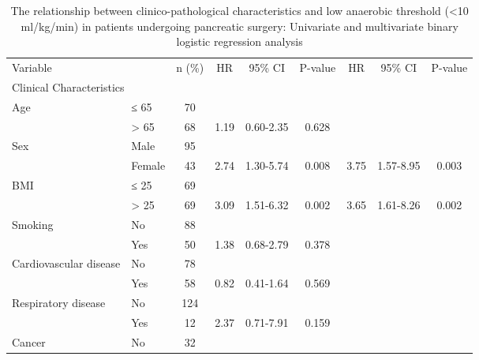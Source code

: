 \documentclass[]{article}
\begin{document}
	

	


\begin{sidewaystable}
	\caption{The relationship  between clinico-pathological characteristics and low anaerobic threshold (<10 ml/kg/min) in patients undergoing pancreatic surgery: Univariate and multivariate binary logistic regression analysis}
	\label{table:ch03_regression}
	\begin{tabular}{l l c c c c c c c}
		Variable                &        & n (\%) & HR   & 95\% CI    & P-value & HR   & 95\% CI    & P-value \\
		\multicolumn{9}{l}{Clinical Characteristics}                                                          \\
		Age                     & ≤ 65   & 70     &      &            &         &      &            &  \\
		                        & > 65   & 68     & 1.19 & 0.60-2.35  & 0.628   &      &            &  \\
		Sex                     & Male   & 95     &      &            &         &      &            &  \\
		                        & Female & 43     & 2.74 & 1.30-5.74  & 0.008   & 3.75 & 1.57-8.95  & 0.003   \\
		BMI                     & ≤ 25   & 69     &      &            &         &      &            &  \\
		                        & > 25   & 69     & 3.09 & 1.51-6.32  & 0.002   & 3.65 & 1.61-8.26  & 0.002   \\
		Smoking                 & No     & 88     &      &            &         &      &            &  \\
		                        & Yes    & 50     & 1.38 & 0.68-2.79  & 0.378   &      &            &  \\
		Cardiovascular disease  & No     & 78     &      &            &         &      &            &  \\
		                        & Yes    & 58     & 0.82 & 0.41-1.64  & 0.569   &      &            &  \\
		Respiratory disease     & No     & 124    &      &            &         &      &            &  \\
		                        & Yes    & 12     & 2.37 & 0.71-7.91  & 0.159   &      &            &  \\
		Cancer                  & No     & 32     &      &            &         &      &            &  \\

\end{tabular}
\end{sidewaystable}
\end{document}
